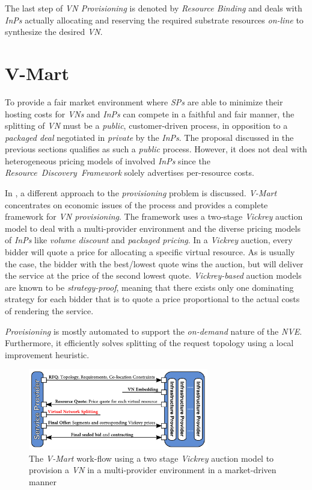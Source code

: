 \documentclass[prodmode,acmtomccap]{acmlarge}
\begin{document}
The last step of \emph{VN Provisioning} is denoted by \emph{Resource Binding} and deals with \emph{InPs} actually allocating and reserving the required substrate resources \emph{on-line} to synthesize
the desired \emph{VN}.

\section{V-Mart}
\label{sec:vmart}
To provide a fair market environment where \emph{SPs} are able to minimize their hosting costs for \emph{VNs} and \emph{InPs} can compete in a faithful and fair manner,
the splitting of \emph{VN} must be a \emph{public}, customer-driven process, in opposition to a \emph{packaged deal} negotiated in \emph{private} by the \emph{InPs}.
The proposal discussed in the previous sections qualifies as such a \emph{public} process. However, it does not deal with heterogeneous pricing models of involved \emph{InPs} since
the \emph{Resource~Discovery~Framework} solely advertises per-resource costs.

In , a different approach to the \emph{provisioning} problem is discussed. \emph{V-Mart} concentrates on economic issues of the 
process and provides a complete framework for \emph{VN provisioning}.
The framework uses a two-stage \emph{Vickrey} auction model to deal with a multi-provider environment and the diverse pricing models of \emph{InPs} like 
\emph{volume discount} and \emph{packaged pricing}. In a \emph{Vickrey} auction, every bidder will quote a price for allocating a specific virtual resource. As is usually the case, 
the bidder with the best/lowest quote wins the auction, but will deliver the service at the price of the second lowest quote. \emph{Vickrey-based} auction models are known to be \emph{strategy-proof},
meaning that there exists only one dominating strategy for each bidder that is to quote a price proportional to the actual costs of rendering the service.

\emph{Provisioning} is mostly automated to support the \emph{on-demand} nature of the \emph{NVE}. Furthermore, it
efficiently solves splitting of the request topology using a local improvement heuristic.

\begin{figure}[htb]
	\centering
	\includegraphics[width=0.7\textwidth]{vmart}
	\caption{The \emph{V-Mart} work-flow using a two stage \emph{Vickrey} auction model to provision a \emph{VN} in a multi-provider environment in a market-driven manner}
	\label{fig7}
\end{figure}
\end{document}
